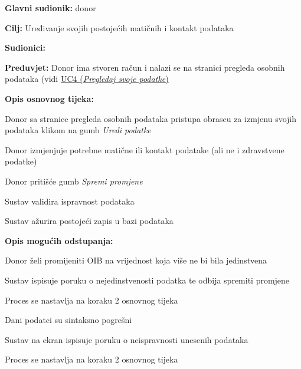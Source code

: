 					
					\noindent {}
					\begin{packed_item} \label{UC5}
	
						\item \textbf{Glavni sudionik: }donor
						\item  \textbf{Cilj:} Uređivanje svojih postojećih matičnih i kontakt podataka
						\item  \textbf{Sudionici:} 
						\item  \textbf{Preduvjet: }Donor ima stvoren račun i nalazi se na stranici pregleda osobnih podataka (vidi \hyperref[UC4]{UC4 (\textit{Pregledaj svoje podatke})}
						\item  \textbf{Opis osnovnog tijeka:}
						
						\item[] \begin{packed_enum}
						    \item Donor sa stranice pregleda osobnih podataka pristupa obrascu za izmjenu svojih podataka klikom na gumb \textit{Uredi podatke}
	                        \item Donor izmjenjuje potrebne matične ili kontakt podatake (ali ne i zdravstvene podatke)
	                        \item Donor pritišće gumb \textit{Spremi promjene}
	                        \item Sustav validira ispravnost podataka
	                        \item Sustav ažurira postojeći zapis u bazi podataka
	                        
						\end{packed_enum}
						
						\item  \textbf{Opis mogućih odstupanja:}
						
						\item[] \begin{packed_item}
	
							\item[4.a] Donor želi promijeniti OIB na vrijednost koja više ne bi bila jedinstvena
							\begin{packed_enum}
								\item Sustav ispisuje poruku o nejedinstvenosti podatka te odbija spremiti promjene
								\item Proces se nastavlja na koraku 2 osnovnog tijeka
							\end{packed_enum}
							
							\item[4.b] Dani podatci su sintaksno pogrešni
							\begin{packed_enum}
								\item Sustav na ekran ispisuje poruku o neispravnosti unesenih podataka
								\item Proces se nastavlja na koraku 2 osnovnog tijeka
							\end{packed_enum}
							
						\end{packed_item}
						
					\end{packed_item}
					

